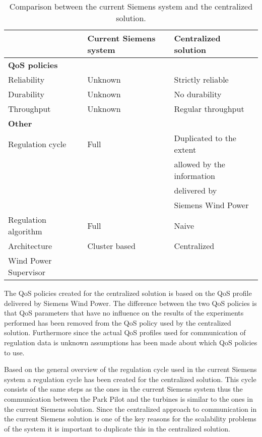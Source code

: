 \begin{table}
	\begin{tabular}{l l l}
		\hline
		\hline
		~ & \textbf{Current Siemens system} & \textbf{Centralized solution} \\
		\hline
		\hline
		\multicolumn{3}{l}{\textbf{QoS policies}} \\
		\hline
		Reliability & Unknown & Strictly reliable \\
		\hline
		Durability & Unknown & No durability \\
		\hline
		Throughput & Unknown & Regular throughput \\
		\hline
		\hline
		\multicolumn{3}{l}{\textbf{Other}} \\
		\hline
		\hline
		Regulation cycle & Full & Duplicated to the extent\\
		~ & ~ & allowed by the information\\
		~ & ~ & delivered by\\
		~ & ~ & Siemens Wind Power\\
		\hline
		Regulation algorithm & Full & Naive \\
		\hline
		Architecture & Cluster based & Centralized \\
		\hline
		Wind Power Supervisor & \checkmark & \text{x} \\
		\hline
		\hline
	\end{tabular}
	
	\caption[Comparison between the current Siemens system and the centralized solution]{
		\label{tab:centralizedVSsiemens}
		\footnotesize{%
			Comparison between the current Siemens system and the centralized solution.
		} 
	}
\end{table}

The QoS policies created for the centralized solution is based on the QoS profile delivered by Siemens Wind Power. The difference between the two QoS policies is that QoS parameters that have no influence on the results of the experiments performed has been removed from the QoS policy used by the centralized solution. Furthermore since the actual QoS profiles used for communication of regulation data is unknown assumptions has been made about which QoS policies to use.

Based on the general overview of the regulation cycle used in the current Siemens system a regulation cycle has been created for the centralized solution. This cycle consists of the same steps as the ones in the current Siemens system thus the communication between the Park Pilot and the turbines is similar to the ones in the current Siemens solution. Since the centralized approach to communication in the current Siemens solution is one of the key reasons for the scalability problems of the system it is important to duplicate this in the centralized solution.

